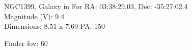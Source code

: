 \begin{block}{NGC1399, Galaxy in For}
    RA: 03:38:29.03, Dec: -35:27:02.4 \\ 
    Magnitude (V): 9.4 \\ 
    Dimensions: 8.51 x 7.69 PA: 150 

    Finder fov: 60 
\end{block}